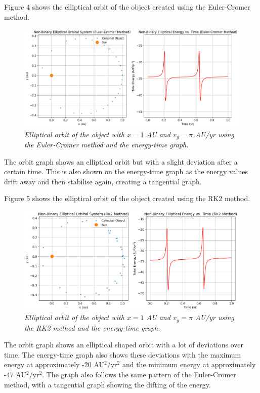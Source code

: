 \documentclass[11 pt, a4paper]{article}
\begin{document}
Figure 4 shows the elliptical orbit of the object created using the Euler-Cromer method.
\begin{figure}[H]
  \includegraphics[width=1\linewidth]{Euler cromer/eulercromerelliptic.png}
  \centering
  \caption{\textit{Elliptical orbit of the object with $x = 1$ AU and $v_y = \pi$ AU/yr using the Euler-Cromer method and the energy-time graph.}} 
\end{figure}
The orbit graph shows an elliptical orbit but with a slight deviation after a certain time. This is also shown on the energy-time graph as the energy values drift away and then stabilise again, creating a tangential graph.

Figure 5 shows the elliptical orbit of the object created using the RK2 method.
\begin{figure}[H]
  \includegraphics[width=1\linewidth]{RK2/rk2elliptic.png}
  \centering
  \caption{\textit{Elliptical orbit of the object with $x = 1$ AU and $v_y = \pi$ AU/yr using the RK2 method and the energy-time graph.}} 
\end{figure}
The orbit graph shows an elliptical shaped orbit with a lot of deviations over time. The energy-time graph also 
shows these deviations with the maximum energy at approximately -20 AU$^2$/yr$^2$ and the minimum energy at approximately
-47 AU$^2$/yr$^2$. The graph also follows the same pattern of the Euler-Cromer method, with a tangential graph showing the difting of the energy.
\end{document}
